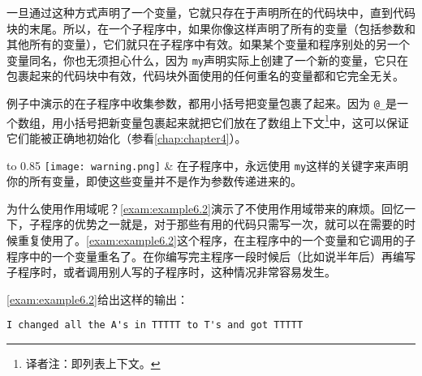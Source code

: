 一旦通过这种方式声明了一个变量，它就只存在于声明所在的代码块中，直到代码块的末尾。所以，在一个子程序中，如果你像这样声明了所有的变量（包括参数和其他所有的变量），它们就只在子程序中有效。如果某个变量和程序别处的另一个变量同名，你也无须担心什么，因为 \verb|my|声明实际上创建了一个新的变量，它只在包裹起来的代码块中有效，代码块外面使用的任何重名的变量都和它完全无关。

例子中演示的在子程序中收集参数，都用小括号把变量包裹了起来。因为 \verb|@_|是一个数组，用小括号把新变量包裹起来就把它们放在了数组上下文\footnote{译者注：即列表上下文。}中，这可以保证它们能被正确地初始化（参看\autoref{chap:chapter4}）。


\vspace{-5pt}
\begin{table}[h]
  \begin{center}
    \begin{tabu*} to 0.85\linewidth {|X[1,r,m]X[15,l,m]|}
      \tabucline{-}
      \texttt{[image: warning.png]} & 在子程序中，永远使用 \verb|my|这样的关键字来声明你的所有变量，即使这些变量并不是作为参数传递进来的。\\
      \tabucline{-}
    \end{tabu*}
  \end{center}
\end{table}
\vspace{-20pt}

为什么使用作用域呢？\autoref{exam:example6.2}演示了不使用作用域带来的麻烦。回忆一下，子程序的优势之一就是，对于那些有用的代码只需写一次，就可以在需要的时候重复使用了。\autoref{exam:example6.2}这个程序，在主程序中的一个变量和它调用的子程序中的一个变量重名了。在你编写完主程序一段时候后（比如说半年后）再编写子程序时，或者调用别人写的子程序时，这种情况非常容易发生。



\autoref{exam:example6.2}给出这样的输出：

\begin{lstlisting}
I changed all the A's in TTTTT to T's and got TTTTT 
\end{lstlisting}


